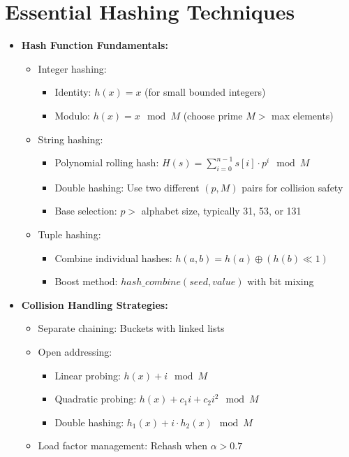 \documentclass[a4paper,10pt]{book}
\begin{document}
\chapter{Essential Hashing Techniques }
\label{sec:hashing}
\begin{itemize}
    \item \textbf{Hash Function Fundamentals:}
    \begin{itemize}
        \item Integer hashing:
        \begin{itemize}
            \item Identity: $h(x) = x$ (for small bounded integers)
            \item Modulo: $h(x) = x \mod M$ (choose prime $M >$ max elements)
        \end{itemize}
        \item String hashing:
        \begin{itemize}
            \item Polynomial rolling hash: $H(s) = \sum_{i=0}^{n-1} s[i] \cdot p^i \mod M$
            \item Double hashing: Use two different $(p, M)$ pairs for collision safety
            \item Base selection: $p > $ alphabet size, typically 31, 53, or 131
        \end{itemize}
        \item Tuple hashing:
        \begin{itemize}
            \item Combine individual hashes: $h(a,b) = h(a) \oplus (h(b) \ll 1)$ 
            \item Boost method: $hash\_combine(seed, value)$ with bit mixing
        \end{itemize}
    \end{itemize}
    
    \item \textbf{Collision Handling Strategies:}
    \begin{itemize}
        \item Separate chaining: Buckets with linked lists
        \item Open addressing:
        \begin{itemize}
            \item Linear probing: $h(x) + i \mod M$
            \item Quadratic probing: $h(x) + c_1 i + c_2 i^2 \mod M$
            \item Double hashing: $h_1(x) + i \cdot h_2(x) \mod M$
        \end{itemize}
        \item Load factor management: Rehash when $\alpha > 0.7$
    \end{itemize}
    

\end{itemize}
\end{document}
